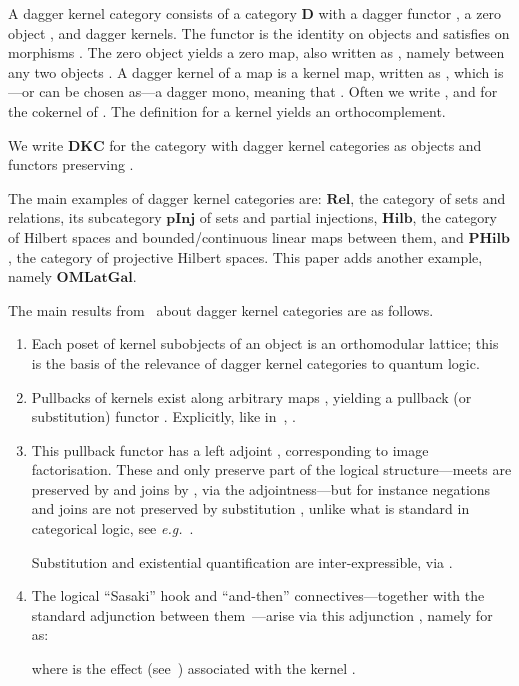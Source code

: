 \documentclass{article}
\newcommand{\Cat}[1]{\ensuremath{\mathbf{#1}}}
\newcommand{\Rel}{\Cat{Rel}\xspace}
\newcommand{\Hilb}{\Cat{Hilb}\xspace}
\newcommand{\PHilb}{\Cat{PHilb}\xspace}
\begin{document}
A dagger kernel category consists of a category \Cat{D} with a dagger
functor , a zero object
, and dagger kernels. The functor  is the identity
on objects  and satisfies  on morphisms
. The zero object  yields a zero map, also written as ,
namely  between any two objects
. A dagger kernel of a map  is
a kernel map, written as , which is---or can be chosen as---a dagger mono,
meaning that . Often we write , and  for the cokernel of
. The definition  for a kernel 
yields an orthocomplement.

We write \Cat{DKC} for the category with dagger kernel categories
as objects and functors preserving .

The main examples of dagger kernel categories are: \Rel, the category
of sets and relations, its subcategory \Cat{pInj} of sets and partial
injections, \Hilb, the category of Hilbert spaces and
bounded/continuous linear maps between them, and \PHilb, the category
of projective Hilbert spaces. This paper adds another example, namely
\Cat{OMLatGal}.

The main results from~\cite{HeunenJ09a} about dagger kernel categories
are as follows.
\begin{enumerate}
\item Each poset  of kernel subobjects of an object  is
  an orthomodular lattice; this is the basis of the relevance of
  dagger kernel categories to quantum logic.

\item Pullbacks of kernels exist along arbitrary maps , yielding a pullback (or substitution) functor
  . Explicitly, like
  in~\cite{Freyd64}, .

\item This pullback functor  has a left adjoint , corresponding to image
  factorisation. These  and  only preserve part of
  the logical structure---meets are preserved by  and joins by
  , via the adjointness---but for instance negations and
  joins are not preserved by substitution , unlike what is
  standard in categorical logic, see \textit{e.g.}~\cite{Jacobs99a}.

  Substitution  and existential quantification 
  are inter-expressible, via .

\item The logical ``Sasaki'' hook  and ``and-then''
   connectives---together with the standard adjunction
  between them~\cite{Finch70,CoeckeS04}---arise via this adjunction
  , namely for  as:


\noindent where 
is the effect (see~\cite{DvurecenskijP00}) associated with the kernel
.
\end{enumerate}
\end{document}
